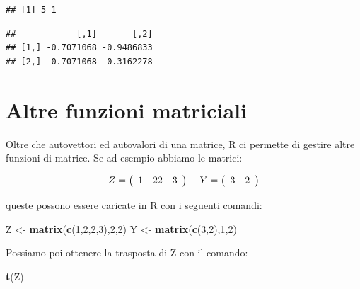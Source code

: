 \documentclass[a4paper,12pt,oneside]{book}
\newenvironment{Shaded}{\begin{snugshade}}{\end{snugshade}}
\newcommand{\KeywordTok}[1]{\textcolor[rgb]{0.13,0.29,0.53}{\textbf{#1}}}
\newcommand{\DecValTok}[1]{\textcolor[rgb]{0.00,0.00,0.81}{#1}}
\newcommand{\StringTok}[1]{\textcolor[rgb]{0.31,0.60,0.02}{#1}}
\newcommand{\OperatorTok}[1]{\textcolor[rgb]{0.81,0.36,0.00}{\textbf{#1}}}
\newcommand{\NormalTok}[1]{#1}
\begin{document}
\begin{verbatim}
## [1] 5 1
\end{verbatim}

\begin{Shaded}
\end{Shaded}

\begin{verbatim}
##            [,1]       [,2]
## [1,] -0.7071068 -0.9486833
## [2,] -0.7071068  0.3162278
\end{verbatim}

\section{Altre funzioni matriciali}\label{altre-funzioni-matriciali}

Oltre che autovettori ed autovalori di una matrice, R ci permette di
gestire altre funzioni di matrice. Se ad esempio abbiamo le matrici:

\[
Z = \left( {\begin{array}{*{20}c}
   1 & 2  
   2 & 3  
\end{array}} \right)\,\,\,\,\,\,\,Y = \left( {\begin{array}{*{20}c}
   3 & 2  
\end{array}} \right)
\]

queste possono essere caricate in R con i seguenti comandi:

\begin{Shaded}
\begin{Highlighting}[]
\NormalTok{Z  <-}\StringTok{  }\KeywordTok{matrix}\NormalTok{(}\KeywordTok{c}\NormalTok{(}\DecValTok{1}\NormalTok{,}\DecValTok{2}\NormalTok{,}\DecValTok{2}\NormalTok{,}\DecValTok{3}\NormalTok{),}\DecValTok{2}\NormalTok{,}\DecValTok{2}\NormalTok{)}
\NormalTok{Y  <-}\StringTok{  }\KeywordTok{matrix}\NormalTok{(}\KeywordTok{c}\NormalTok{(}\DecValTok{3}\NormalTok{,}\DecValTok{2}\NormalTok{),}\DecValTok{1}\NormalTok{,}\DecValTok{2}\NormalTok{)}
\end{Highlighting}
\end{Shaded}

Possiamo poi ottenere la trasposta di Z con il comando:

\begin{Shaded}
\begin{Highlighting}[]
\KeywordTok{t}\NormalTok{(Z)}
\end{Highlighting}
\end{Shaded}
\end{document}
